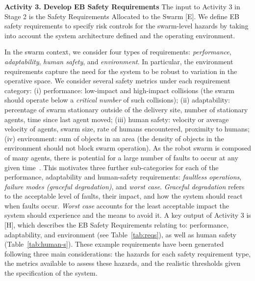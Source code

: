 \documentclass[runningheads]{llncs}
\begin{document}
\noindent\textbf{Activity 3. Develop EB Safety Requirements} The input to Activity 3 in Stage 2 is the Safety Requirements Allocated to the Swarm [E]. 
We define EB safety requirements to specify risk controls for the swarm-level hazards by taking into account the system architecture defined and the operating environment. 

In the swarm context, we consider four types of requirements: \emph{performance}, \emph{adaptability}, \emph{human safety}, and \emph{environment}. 
In particular, the environment requirements capture the need for the system to be robust to variation in the operative space.
We consider several safety metrics under each requirement category: 
(i) performance: low-impact and high-impact collisions (the swarm should operate below a \emph{critical number} of such collisions); %
(ii) adaptability: percentage of swarm stationary outside of the delivery site, number of stationary agents, time since last agent moved; 
(iii) human safety: velocity or average velocity of agents, swarm size, rate of humans encountered, proximity to humans;
(iv) environment: sum of objects in an area (the density of objects in the environment should not block swarm operation).
As the robot swarm is composed of many agents, there is potential for a large number of faults to occur at any given time~\cite{Lee2022}. This motivates three further sub-categories for each of the performance, adaptability and human-safety requirements: \emph{faultless operations}, \emph{failure modes (graceful degradation)}, and \emph{worst case}. 
\emph{Graceful degradation} refers to the acceptable level of faults, their impact, and how the system should react when faults occur. \emph{Worst case} accounts for the least acceptable impact the system should experience and the means to avoid it. 
A key output of Activity 3 is [H], which describes the EB Safety Requirements relating to: performance, adaptability, and environment (see Table~\ref{tab:reqs}), as well as human safety (Table~\ref{tab:human-s}). 
These example requirements have been generated following three main considerations: the hazards for each safety requirement type, the metrics available to assess these hazards, and the realistic thresholds given the specification of the system.
\end{document}
